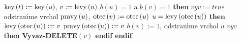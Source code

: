 \phantom{------}$\operatorname{key}\left(t\right):=\operatorname{key}\left(u\right)$, $v:=\operatorname{levy}\left(u\right)$ \newline 
\phantom{------}{\bf if} $b\left(u\right)=1$ a $b\left(v\right)=1$ {\bf then}\newline 
\phantom{---------}$vyv:=true$\newline 
\phantom{------}{\bf endif}\newline 
\phantom{------}odstran\'\i me vrchol $\operatorname{pravy}\left(u\right)$, $\operatorname{otec}\left(v\right):=\operatorname{otec}\left(u\right)$\newline
\phantom{------}{\bf if} $u=\operatorname{levy}\left(\operatorname{otec}\left(u\right)\right)$ {\bf then}\newline 
\phantom{---------}$\operatorname{levy}\left(\operatorname{otec}\left(u\right)\right):=v$\newline 
\phantom{------}{\bf else}\newline 
\phantom{---------}$\operatorname{pravy}\left(\operatorname{otec}\left(u\right)\right):=v$\newline 
\phantom{------}{\bf endif}\newline 
\phantom{------}$b\left(v\right):=1$, odstran\'\i me vrchol $u$\newline 
\phantom{---}{\bf endif} \newline 
\phantom{---}{\bf if} $vyv$ {\bf then Vyvaz-DELETE$\left(v\right)$ endif\newline 
endif}
\medskip

